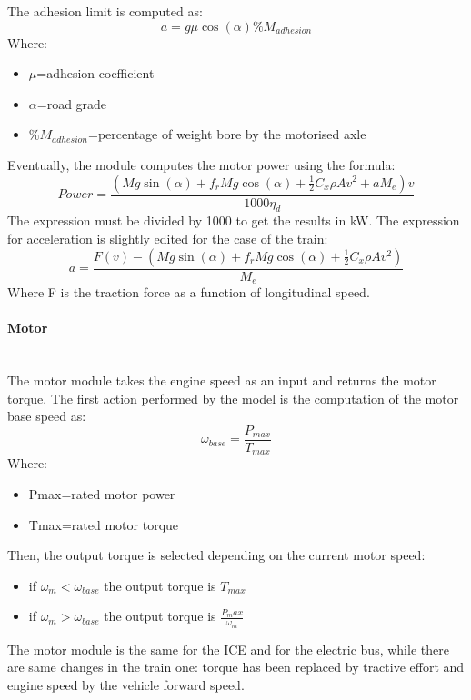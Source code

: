 \documentclass{article}
\newcommand{\subsubsubsection}[1]{\paragraph{#1}\mbox{}\\}
\begin{document}
The adhesion limit is computed as:
\begin{equation}
a=g\mu \cos(\alpha)\%M_{adhesion}
\end{equation}
Where:
\begin{itemize}
\item $\mu$=adhesion coefficient 
\item $\alpha$=road grade 
\item $\%M_{adhesion}$=percentage of weight bore by the motorised axle
\end{itemize}
Eventually, the module computes the motor power using the formula: 
\begin{equation}
Power=\frac{(Mg\sin(\alpha)+f_{r}Mg\cos(\alpha)+\frac{1}{2}C_{x}\rho Av^2+aM_{e})v}{1000\eta_{d}}
\end{equation}
The expression must be divided by 1000 to get the results in kW. The expression for acceleration is slightly edited for the case of the train: 
\begin{equation}
a=\frac{F(v)-(Mg\sin(\alpha)+f_{r}Mg\cos(\alpha)+\frac{1}{2}C_{x}\rho Av^2)}{M_{e}}
\end{equation}
Where F is the traction force as a function of longitudinal speed.\\

\subsubsubsection{Motor}
The motor module takes the engine speed as an input and returns the motor torque. The first action performed by the model is the computation of the motor base speed as: 
\begin{equation}
\omega_{base}=\frac{P_{max}}{T_{max}}
\end{equation}
Where:
\begin{itemize}
\item Pmax=rated motor power 
\item Tmax=rated motor torque 
\end{itemize}
Then, the output torque is selected depending on the current motor speed:
\begin{itemize}
\item if $\omega_m< \omega_{base}$ the output torque is $T_{max}$
\item if  $\omega_m> \omega_{base} $ the output torque is $\frac{P_max}{\omega_m}$
\end{itemize}
The motor module is the same for the ICE and for the electric bus, while there are same changes in the train one: torque has been replaced by tractive effort and engine speed by the vehicle forward speed.\\
\end{document}
